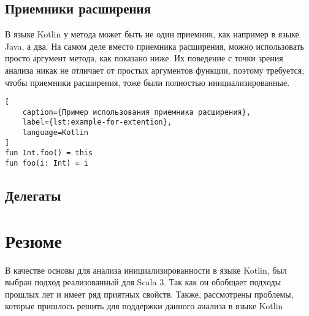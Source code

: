 \subsection{Приемники расширения}\label{subsec:приемники-расширения}

В языке Kotlin у метода может быть не один приемник, как например в языке Java, а два.
На самом деле вместо приемника расширения, можно использовать просто аргумент метода, как показано ниже.
Их поведение с точки зрения анализа никак не отличает от простых аргументов функции, поэтому требуется,
чтобы приемники расширения, тоже были полностью инициализированные.
\begin{lstlisting}[
    caption={Пример использования приемника расширения},
    label={lst:example-for-extention},
    language=Kotlin
]
fun Int.foo() = this
fun foo(i: Int) = i
\end{lstlisting}

\subsection{Делегаты}\label{subsec:делегаты-}


\section{Резюме}\label{sec:резюме-}

В качестве основы для анализа инициализированности в языке Kotlin, был выбран подход реализованный для Scala 3.
Так как он обобщает подходы прошлых лет и имеет ряд приятных свойств.
Также, рассмотрены проблемы, которые пришлось решить для поддержки данного анализа в языке Kotlin
